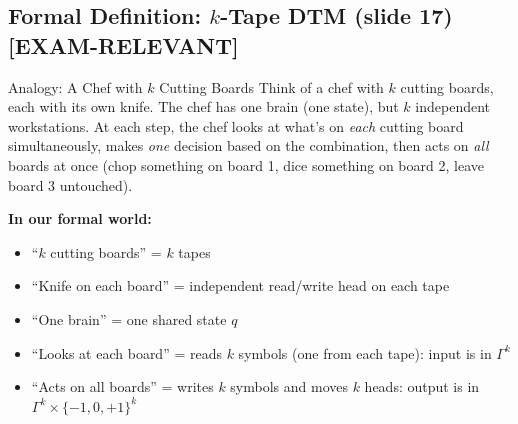 \documentclass[11pt,a4paper]{article}
\newcommand{\kemark}{\textcolor{red!70!black}{\textbf{[EXAM-RELEVANT]}}}
\begin{document}
\subsection{Formal Definition: $k$-Tape DTM (slide 17) \kemark}

\begin{notebox}{Analogy: A Chef with $k$ Cutting Boards}
Think of a chef with $k$ cutting boards, each with its own knife. The chef has one brain (one state), but $k$ independent workstations. At each step, the chef looks at what's on \textit{each} cutting board simultaneously, makes \textit{one} decision based on the combination, then acts on \textit{all} boards at once (chop something on board 1, dice something on board 2, leave board 3 untouched).

\textbf{In our formal world:}
\begin{itemize}[nosep]
\item ``$k$ cutting boards'' = $k$ tapes
\item ``Knife on each board'' = independent read/write head on each tape
\item ``One brain'' = one shared state $q$
\item ``Looks at each board'' = reads $k$ symbols (one from each tape): input is in $\Gamma^k$
\item ``Acts on all boards'' = writes $k$ symbols and moves $k$ heads: output is in $\Gamma^k \times \{-1,0,+1\}^k$
\end{itemize}
\end{notebox}
\end{document}
